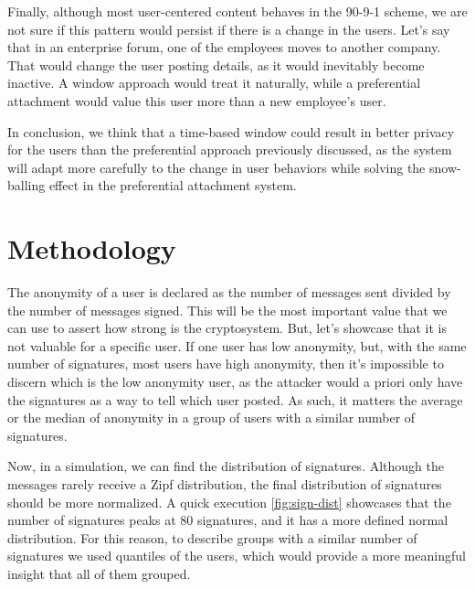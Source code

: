 \documentclass[11pt,congress]{ieeetran}
\begin{document}
Finally, although most user-centered content behaves in the 90-9-1 scheme, we are not sure if this pattern would persist if there is a change in the users. Let's say that in an enterprise forum, one of the employees moves to another company. That would change the user posting details, as it would inevitably become inactive. A window approach would treat it naturally, while a preferential attachment would value this user more than a new employee's user.

In conclusion, we think that a time-based window could result in better privacy for the users than the preferential approach previously discussed, as the system will adapt more carefully to the change in user behaviors while solving the snow-balling effect in the preferential attachment system.

\section{Methodology}
\label{sec:org98acfc0}
The anonymity of a user is declared as the number of messages sent divided by the number of messages signed. This will be the most important value that we can use to assert how strong is the cryptosystem. But, let's showcase that it is not valuable for a specific user. If one user has low anonymity, but, with the same number of signatures, most users have high anonymity, then it's impossible to discern which is the low anonymity user, as the attacker would a priori only have the signatures as a way to tell which user posted. As such, it matters the average or the median of anonymity in a group of users with a similar number of signatures.

Now, in a simulation, we can find the distribution of signatures. Although the messages rarely receive a Zipf distribution, the final distribution of signatures should be more normalized. A quick execution \ref{fig:sign-dist} showcases that the number of signatures peaks at 80 signatures, and it has a more defined normal distribution. For this reason, to describe groups with a similar number of signatures we used quantiles of the users, which would provide a more meaningful insight that all of them grouped.
\end{document}
